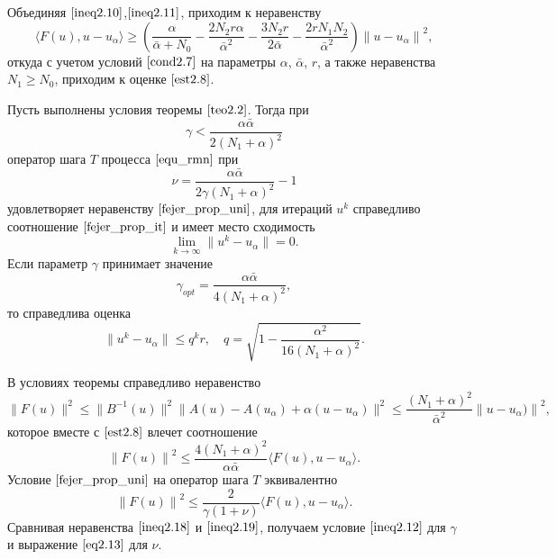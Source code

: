 Объединяя $\eqref{ineq2.10}$,$\eqref{ineq2.11}$, приходим к неравенству $$
\langle F(u), u-u_\alpha\rangle\ge\left (\frac{\alpha}{\bar\alpha+N_0}-\frac{2N_2 r \alpha}{{\bar\alpha}^2}-\frac{3N_2r}{2\bar\alpha}-\frac{2rN_1 N_2}{{\bar\alpha}^2}\right ){\|u-u_\alpha\|}^2, $$ откуда с учетом условий $\eqref{cond2.7}$ на параметры $\alpha$, $\bar\alpha$, $r$, а также неравенства $N_1\ge N_0$, приходим к оценке $\eqref{est2.8}$.
\begin{theorem} \label{teo2.3} 
	Пусть выполнены условия теоремы $\ref{teo2.2}$. Тогда при
	\begin{equation}\label{ineq2.12}
	\gamma<\frac{\alpha\bar\alpha}{2(N_1+\alpha)^2}
	\end{equation}
	оператор шага $T$ процесса $\eqref{equ_rmn}$ при
	\begin{equation}\label{eq2.13}
	\nu=\frac{\alpha\bar\alpha}{2\gamma(N_1+\alpha)^2}-1
	\end{equation}
	удовлетворяет неравенству $\eqref{fejer_prop_uni}$, для итераций $u^k$ справедливо соотношение $\eqref{fejer_prop_it}$ и имеет место сходимость
	\begin{equation}\label{eq2.14}
	\lim_{k\to\infty}\|u^k-u_\alpha\|=0.
	\end{equation}
	Если параметр $\gamma$ принимает значение \begin{equation}\label{eq2.15}
	{\gamma}_{opt}=\frac{\alpha\bar\alpha}{4(N_1+\alpha)^2},
	\end{equation} то справедлива оценка \begin{equation}\label{est2.16}
	\|u^k-u_\alpha\|\le q^k r, \quad q=\sqrt{1-\frac{{\alpha}^2}  {16(N_1+\alpha)^2}}.\end{equation}
\end{theorem}
\proof В условиях теоремы справедливо неравенство
\begin{equation}\label{eq2.17}
\|F(u)\|^2\le\|B^{-1}(u)\|^2\|A(u)-A(u_\alpha)+\alpha(u-u_\alpha)\|^2 \le \frac{(N_1+\alpha)^2}{\bar\alpha^2}{\|u-u_\alpha)\|}^2,
\end{equation}
которое вместе с $\eqref{est2.8}$ влечет соотношение
\begin{equation}\label{ineq2.18}
{\|F(u)\|}^2 \le \frac{4(N_1+\alpha)^2}{\alpha\bar\alpha}\langle F(u), u-u_\alpha\rangle.
\end{equation}
Условие $\eqref{fejer_prop_uni}$ на оператор шага $T$ эквивалентно 
\begin{equation}\label{ineq2.19}
{\|F(u)\|}^2 \le \frac{2}{\gamma(1+\nu)}\langle F(u), u-u_\alpha\rangle.
\end{equation}
Сравнивая неравенства $\eqref{ineq2.18}$ и $\eqref{ineq2.19}$, получаем условие $\eqref{ineq2.12}$ для $\gamma$ и выражение $\eqref{eq2.13}$ для $\nu$.

